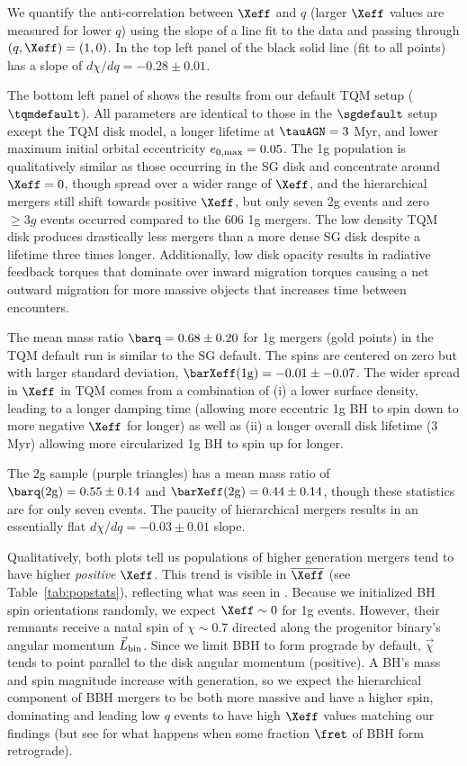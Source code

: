 We quantify the anti-correlation between $\Xeff$ and $q$ (larger $\Xeff$ values are measured for lower $q$) using the slope of a line fit to the data and passing through $(q,\Xeff)=(1,0)$.
In the top left panel of  the black solid line (fit to all points) has a slope of $d\chi/dq=-0.28\pm0.01$.

The bottom left panel of  shows the results from our default TQM setup ($\tqmdefault$).
All parameters are identical to those in the $\sgdefault$ setup except the TQM disk model, a longer lifetime at $\tauAGN=3$ Myr, and lower maximum initial orbital eccentricity $e_{\rm 0,max}=0.05$.
The 1g population is qualitatively similar as those occurring in the SG disk and concentrate around $\Xeff=0$, though spread over a wider range of $\Xeff$, and the hierarchical mergers still shift towards positive $\Xeff$, but only seven 2g events and zero $\geq3g$ events occurred compared to the 606 1g mergers.
The low density TQM disk produces drastically less mergers than a more dense SG disk despite a lifetime three times longer.
Additionally, low disk opacity results in radiative feedback torques that dominate over inward migration torques causing a net outward migration for more massive objects that increases time between encounters.

The mean mass ratio $\barq=0.68\pm0.20$ for 1g mergers (gold points) in the TQM default run is similar to the SG default.
The spins are centered on zero but with larger standard deviation, $\barXeff({\rm 1g})=-0.01\pm-0.07$.
The wider spread in $\Xeff$ in TQM comes from a combination of (i) a lower surface density, leading to a longer damping time (allowing more eccentric 1g BH to spin down to more negative $\Xeff$ for longer) as well as (ii) a longer overall disk lifetime (3 Myr) allowing more circularized 1g BH to spin up for longer.


The 2g sample (purple triangles) has a mean mass ratio of $\barq({\rm 2g})=0.55\pm0.14$ and $\barXeff({\rm 2g})=0.44\pm0.14$, though these statistics are for only seven events.
The paucity of hierarchical mergers results in an essentially flat $d\chi/dq=-0.03\pm0.01$ slope.

Qualitatively, both plots tell us populations of higher generation mergers tend to have higher \textit{positive} $\Xeff$.
This trend is visible in $\overline{\Xeff}$ (see Table~\ref{tab:popstats}), reflecting what was seen in \citet[][see Fig. 2]{Mckernan+22:q-Xeff}.
Because we initialized BH spin orientations randomly, we expect $\Xeff\sim0$ for 1g events.
However, their remnants receive a natal spin of $\chi \sim 0.7$ directed along the progenitor binary's angular momentum $\vec{L}_{\rm bin}$.
Since we limit BBH to form prograde by default, $\vec{\chi}$ tends to point parallel to the disk angular momentum (positive).
A BH's mass and spin magnitude increase with generation, so we expect the hierarchical component of BBH mergers to be both more massive and have a higher spin, dominating  and leading low $q$ events to have high $\Xeff$ values matching our findings (but see  for what happens when some fraction $\fret$ of BBH form retrograde).

